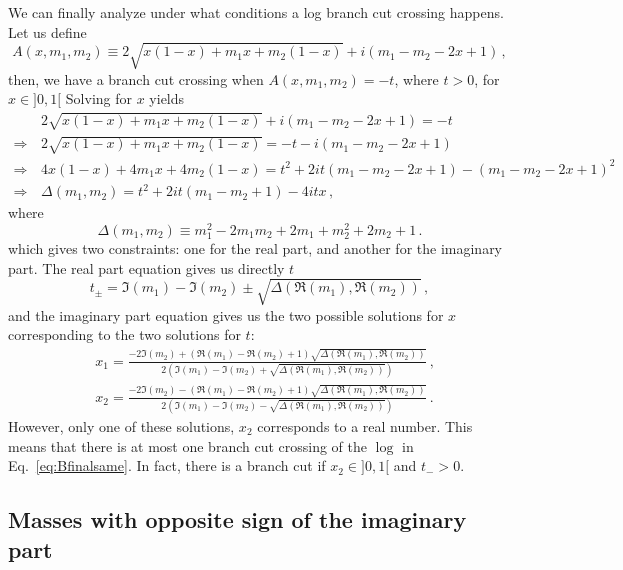 \documentclass[twoside]{article}
\begin{document}
We can finally analyze under what conditions a log branch cut crossing happens. Let us define 
\begin{equation}
A(x, m_1, m_2) \equiv 2 \sqrt{x (1-x) + m_1 x + m_2 (1-x)}+i (m_1-m_2-2 x+1)\,,
\end{equation}
then, we have a branch cut crossing when $A(x, m_1, m_2) = -t$, where $t>0$, for $x \in ]0,1[$
Solving for $x$ yields
\begin{align}
& 2\sqrt{x (1-x) + m_1 x + m_2 (1-x)}+i (m_1-m_2-2 x+1) = -t \\
\Rightarrow\, & 2\sqrt{x (1-x) + m_1 x + m_2 (1-x)} = -t - i (m_1 - m_2 - 2 x +1) \\
\Rightarrow\, & 4 x (1-x) + 4 m_1 x + 4 m_2 (1-x) = t^2 + 2 i t (m_1 - m_2 - 2 x +1) - (m_1 - m_2 - 2 x +1)^2 \\
\Rightarrow\, & \Delta(m_1, m_2) = t^2 + 2 i t (m_1 - m_2 + 1) - 4 i t x  \,,
\end{align}
where
\begin{equation}
\Delta(m_1, m_2) \equiv m_1^2-2 m_1 m_2+2 m_1+m_2^2+2 m_2+1\,.
\end{equation}
which gives two constraints: one for the real part, and another for the imaginary part. The real part equation gives us directly $t$
\begin{equation}
t_\pm = \Im(m_1)-\Im(m_2)\pm\sqrt{\Delta(\Re(m_1), \Re(m_2))}\,,
\end{equation}
and the imaginary part equation gives us the two possible solutions for $x$ corresponding to the two solutions for $t$:
\begin{align}
& x_1 = \frac{- 2 \Im(m_2) + (\Re(m_1)-\Re(m_2)+1) \sqrt{\Delta(\Re(m_1), \Re(m_2))}}{2 \left(\Im(m_1)-\Im(m_2)+\sqrt{\Delta(\Re(m_1), \Re(m_2))}\right)} \,,\\
& x_2 = \frac{- 2 \Im(m_2) - (\Re(m_1)-\Re(m_2)+1) \sqrt{\Delta(\Re(m_1), \Re(m_2))}}{2 \left(\Im(m_1)-\Im(m_2)-\sqrt{\Delta(\Re(m_1), \Re(m_2))}\right)}\,.
\end{align}
However, only one of these solutions, $x_2$ corresponds to a real number. This means that there is at most one branch cut crossing of the $\log$ in Eq.~\eqref{eq:Bfinalsame}. In fact, there is a branch cut if $x_2 \in ]0,1[$ and $t_- > 0$.






\subsection{Masses with opposite sign of the imaginary part}
\end{document}

